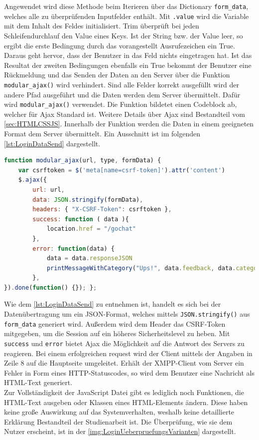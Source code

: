 \documentclass[a4paper,titlepage,halfparskip,12pt]{scrreprt}
\begin{document}
\begin{onehalfspacing}
Angewendet wird diese Methode beim Iterieren über das Dictionary \texttt{form\_data}, welches alle zu überprüfenden Inputfelder enthält. Mit \texttt{.value} wird die Variable mit dem Inhalt des Feldes initialisiert. Trim überprüft bei jeden Schleifendurchlauf den Value eines Keys. Ist der String bzw. der Value leer, so ergibt die erste Bedingung durch das vorangestellt Ausrufezeichen ein True. Daraus geht hervor, dass der Benutzer in das Feld nichts eingetragen hat. Ist das Resultat der zweiten Bedingungen ebenfalls ein True bekommt der Benutzer eine Rückmeldung und das Senden der Daten an den Server über die Funktion \texttt{modular\_ajax()} wird verhindert. Sind alle Felder korrekt ausgefüllt wird der andere Pfad ausgeführt und die Daten werden dem Server übermittelt. Dafür wird \texttt{modular\_ajax()} verwendet. Die Funktion bildetet einen Codeblock ab, welcher für Ajax Standard ist. Weitere Details über Ajax sind Bestandteil vom \autoref{sec:HTMLCSSJS}. Innerhalb der Funktion werden die Daten in einem geeigneten Format dem Server übermittelt. Ein Ausschnitt ist im folgenden \autoref{lst:LoginDataSend} dargestellt.
\begin{lstlisting}[language=Javascript,caption=Ausschnitt aus \texttt{modular\_ajax()},label={lst:LoginDataSend}]
function modular_ajax(url, type, formData) {
	var csrftoken = $('meta[name=csrf-token]').attr('content')
	$.ajax({
		url: url,
		data: JSON.stringify(formData),
		headers: { "X-CSRF-Token": csrftoken },
		success: function ( data ){
			location.href = "/gochat"
		},
		error: function(data) {
			data = data.responseJSON
			printMessageWithCategory("Ups!", data.feedback, data.category);
		}, 
}).done(function() {}); };
\end{lstlisting}
Wie dem \autoref{lst:LoginDataSend} zu entnehmen ist, handelt es sich bei der Datenübertragung um ein JSON-Format, welches mittels \texttt{JSON.stringify()} aus \texttt{form\_data} generiert wird. Außerdem wird dem Header das CSRF-Token mitgegeben, um die Session auf ein höheres Sicherheitslevel zu heben. Mit \texttt{success} und \texttt{error} bietet Ajax die Möglichkeit auf die Antwort des Servers zu reagieren. Bei einem erfolgreichen request wird der Client mittels der Angaben in Zeile 8 auf die Hauptseite umgeleitet. Erhält der XMPP-Client vom Server ein Fehler in Form eines HTTP-Statuscodes, so wird dem Benutzer eine Nachricht als HTML-Text generiert.\cite{jQueryAjax}\\
Zur Vollständigkeit der JavaScript Datei gibt es lediglich noch Funktionen, die \ac{HTML}-Text ausgeben oder Klassen eines \ac{HTML}-Elements ändern. Diese haben keine große Auswirkung auf das Systemverhalten, weshalb keine detaillierte Erklärung Bestandteil der Studienarbeit ist. Die Überprüfung, wie sie dem Nutzer erscheint, ist in der \autoref{img:LoginUeberpruefungsVarianten} dargestellt.

\end{onehalfspacing}
\end{document}
